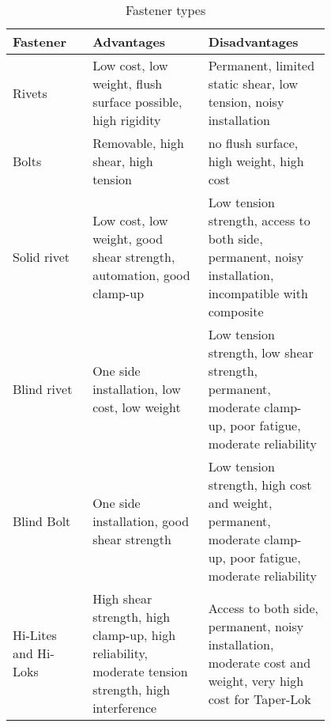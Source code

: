 \documentclass[10pt, twocolumn]{article}
\begin{document}
\begin{table*}[ht] %
  \caption{Fastener types}
  \centering %
  \begin{tabular}{ %
    m{0.2\linewidth}|p{0.3\linewidth}|p{0.3\linewidth}
    }

    Fastener             & Advantages                                                                                         & Disadvantages                                                                                                \\ \hline\hline
    Rivets               & Low cost, low weight, flush surface possible, high rigidity                                        & Permanent, limited static shear, low tension, noisy installation                                             \\ \hline
    Bolts                & Removable, high shear, high tension                                                                & no flush surface, high weight, high cost                                                                     \\ \hline
    Solid rivet          & Low cost, low weight, good shear strength, automation, good clamp-up                               & Low tension strength, access to both side, permanent, noisy installation, incompatible with composite        \\ \hline
    Blind rivet          & One side installation, low cost, low weight                                                        & Low tension strength, low shear strength, permanent, moderate clamp-up, poor fatigue, moderate reliability   \\ \hline
    Blind Bolt           & One side installation, good shear strength                                                         & Low tension strength, high cost and weight, permanent, moderate clamp-up, poor fatigue, moderate reliability \\ \hline
    Hi-Lites and Hi-Loks & High shear strength, high clamp-up, high reliability, moderate tension strength, high interference & Access to both side, permanent, noisy installation, moderate cost and weight, very high cost for Taper-Lok   \\
  \end{tabular}
\end{table*}
\end{document}

